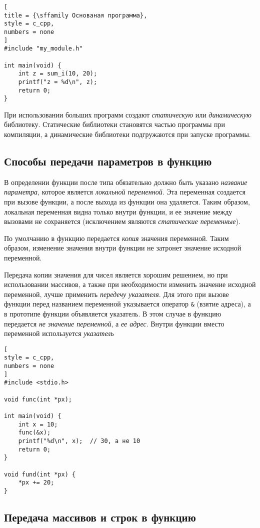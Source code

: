 \documentclass[%
	11pt,
	a4paper,
	utf8,
		]{article}
\begin{document}
\begin{lstlisting}[
title = {\sffamily Основаная программа},
style = c_cpp,
numbers = none
]
#include "my_module.h"

int main(void) {
    int z = sum_i(10, 20);
    printf("z = %d\n", z);
    return 0;
}
\end{lstlisting}

При использовании больших программ создают \emph{статическую} или \emph{динамическую} библиотеку. Статические библиотеки становятся частью программы при компиляции, а динамические библиотеки подгружаются при запуске программы.

\subsection{Способы передачи параметров в функцию}

В определении функции после типа обязательно должно быть указано \emph{название параметра}, которое является \emph{локальной переменной}. Эта переменная создается при вызове функции, а после выхода из функции она удаляется. Таким образом, локальная переменная видна только внутри функции, и ее значение между вызовами не сохраняется (исключением являются \emph{статические переменные}). 

По умолчанию в функцию передается \emph{копия} значения переменной. Таким образом, изменение значения внутри функции не затронет значение исходной переменной.

Передача копии значения для чисел является хорошим решением, но при использовании массивов, а также при необходимости изменить значение исходной переменной, лучше применить \emph{передечу указателя}. Для этого при вызове функции перед названием переменной указывается оператор \verb|&| (взятие адреса), а в прототипе функции объявляется указатель. В этом случае в функцию передается \emph{не значение переменной}, а \emph{ее адрес}. Внутри функции вместо переменной используется \emph{указатель}
\begin{lstlisting}[
style = c_cpp,
numbers = none
]
#include <stdio.h>

void func(int *px);

int main(void) {
    int x = 10;
    func(&x);
    printf("%d\n", x);  // 30, а не 10
    return 0;
}

void fund(int *px) {
    *px += 20;
}
\end{lstlisting}

\subsection{Передача массивов и строк в функцию}
\end{document}
